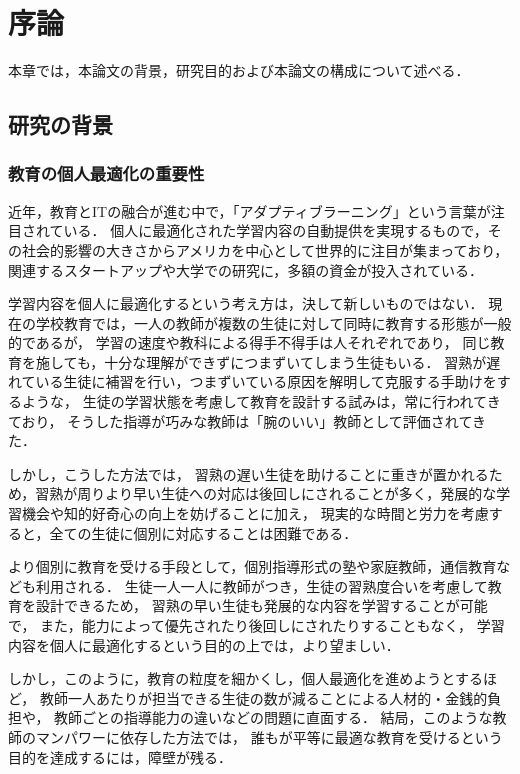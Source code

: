 \chapter{序論}
\label{chap:intro}
\fancyhf{}
\rhead{\thepage}
\cfoot{\thepage}

本章では，本論文の背景，研究目的および本論文の構成について述べる．


\section{研究の背景}

\subsection{教育の個人最適化の重要性}
近年，教育とITの融合が進む中で，「アダプティブラーニング」という言葉が注目されている．
個人に最適化された学習内容の自動提供を実現するもので，その社会的影響の大きさからアメリカを中心として世界的に注目が集まっており，
関連するスタートアップや大学での研究に，多額の資金が投入されている\cite{piccioli2014learning}．


学習内容を個人に最適化するという考え方は，決して新しいものではない．
現在の学校教育では，一人の教師が複数の生徒に対して同時に教育する形態が一般的であるが，
学習の速度や教科による得手不得手は人それぞれであり，
同じ教育を施しても，十分な理解ができずにつまずいてしまう生徒もいる．
習熟が遅れている生徒に補習を行い，つまずいている原因を解明して克服する手助けをするような，
生徒の学習状態を考慮して教育を設計する試みは，常に行われてきており，
そうした指導が巧みな教師は「腕のいい」教師として評価されてきた．

しかし，こうした方法では，
習熟の遅い生徒を助けることに重きが置かれるため，習熟が周りより早い生徒への対応は後回しにされることが多く，発展的な学習機会や知的好奇心の向上を妨げることに加え，
現実的な時間と労力を考慮すると，全ての生徒に個別に対応することは困難である．


より個別に教育を受ける手段として，個別指導形式の塾や家庭教師，通信教育なども利用される．
生徒一人一人に教師がつき，生徒の習熟度合いを考慮して教育を設計できるため，
習熟の早い生徒も発展的な内容を学習することが可能で，
また，能力によって優先されたり後回しにされたりすることもなく，
学習内容を個人に最適化するという目的の上では，より望ましい．

しかし，このように，教育の粒度を細かくし，個人最適化を進めようとするほど，
教師一人あたりが担当できる生徒の数が減ることによる人材的・金銭的負担や，
教師ごとの指導能力の違いなどの問題に直面する．
結局，このような教師のマンパワーに依存した方法では，
誰もが平等に最適な教育を受けるという目的を達成するには，障壁が残る．


